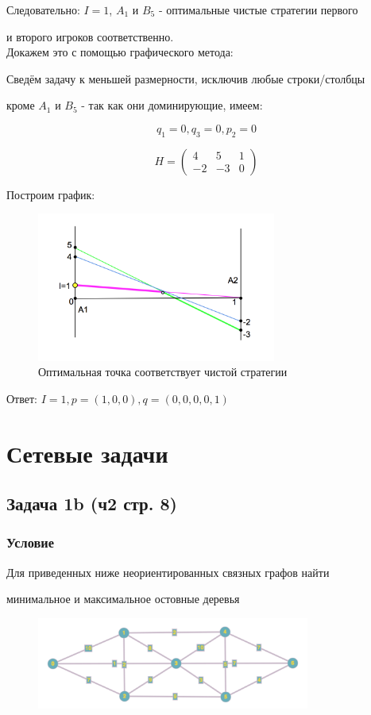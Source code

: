 \documentclass[a4paper,14pt]{extreport}
\begin{document}
Следовательно: $I=1$, $A_1$ и $B_5$ - оптимальные чистые стратегии первого\par и второго игроков соответственно. \\

Докажем это с помощью графического метода:\par
Сведём задачу к меньшей размерности, исключив любые строки/столбцы\par
кроме $A_1$ и $B_5$ - так как они доминирующие, имеем:

\begin{equation*}
    q_1 = 0, q_3 = 0, p_2 = 0
\end{equation*}

\begin{equation}
    H = \begin{pmatrix} 
            4 & 5 & 1 \\ 
            -2 & -3 & 0
        \end{pmatrix}
\end{equation}

Построим график:
\begin{figure}[h]
    \centering
    \includegraphics[width=0.7\textwidth]{plot2.png}
    \caption{Оптимальная точка соответствует чистой стратегии}
\end{figure}

Ответ: $I = 1,p = (1, 0, 0),q = (0, 0, 0, 0, 1)$

\chapter{Сетевые задачи}
\section{Задача 1b (ч2 стр. 8)}
\subsection{Условие}
Для приведенных ниже неориентированных связных графов найти\par минимальное и максимальное остовные деревья
\begin{figure}[h]
    \centering
    \includegraphics[width=0.8\textwidth]{graph.png}
\end{figure}
\end{document}
